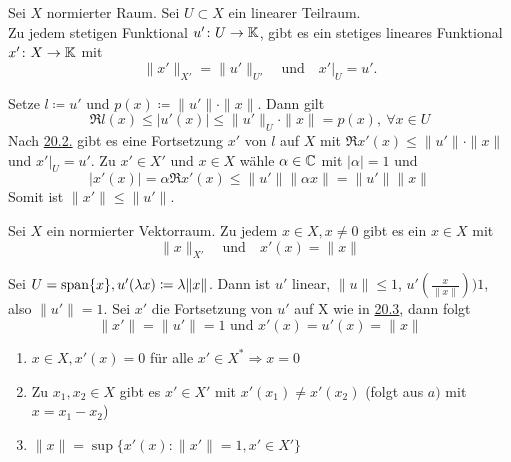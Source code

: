 \begin{satz} \label{satz:20.3-Hahn-Banach} 
	Sei $X$ normierter Raum. Sei $U \subset X$ ein linearer Teilraum. \\
	Zu jedem stetigen Funktional $u' \colon U \rightarrow \mathbb{K}$, gibt es ein stetiges lineares Funktional $x' \colon X \rightarrow \mathbb{K}$ mit 
		\[ \| x' \|_{X'} = \| u' \|_{U'} \quad \text{und} \quad x'|_{U} = u'. \]	
\end{satz}

\begin{beweis}
	Setze $l \coloneqq u'$ und $p(x) \coloneqq \| u'\| \cdot \| x \|$. Dann gilt 
		\[ \Re l(x) \leq | u'(x) | \leq \| u' \|_{U} \cdot \| x \| = p(x), ~ \forall x \in U \]
	Nach \hyperref[satz:20.2-Hahn-Banach]{20.2.} gibt es eine Fortsetzung $x'$ von $l$ auf $X$ mit $\Re x'(x) \leq \| u' \| \cdot \| x \|$ und $x'|_{U} = u'$.	Zu $x' \in X'$ und $x \in X$ wähle $\alpha \in \mathbb{C}$ mit $|\alpha| = 1$ und 
	\[ | x'(x) | = \alpha \Re x'(x) \leq \| u' \| \| \alpha x \| = \| u' \| \| x \|\]
	Somit ist $\| x' \| \leq \| u' \|$.
\end{beweis}


\begin{kor} \label{kor:20.4}
	Sei $X$ ein normierter Vektorraum. Zu jedem $x \in X, x \neq 0$ gibt es ein $x \in X$ mit 
		\[ \| x \|_{X'} \quad \text{und} \quad x'(x) = \| x \| \]
\end{kor}

\begin{beweis}
	Sei $U = \operatorname{span} \{ x \}, u'( \lambda x) \coloneqq \lambda \| x \|$. Dann ist $u'$ linear, $\| u \| \leq 1$, $u'(\frac{x}{\| x \|}) ) 1$, also $\| u' \| = 1$. Sei $x'$ die Fortsetzung von $u'$ auf X wie in \hyperref[satz:20.3-Hahn-Banach]{20.3}, dann folgt
	\[ \| x' \| = \| u' \| = 1 \text{ und } x'(x) = u'(x) = \| x \| \]
\end{beweis}


\begin{folgerung}
	\begin{enumerate}[label=\alph*\upshape)]
		\item $x \in X, x'(x) = 0$ für alle $x' \in X^{*} \Rightarrow x = 0$
		\item Zu $x_{1}, x_{2} \in X$ gibt es $x' \in X'$ mit $x'(x_{1}) \neq x'(x_{2})$ (folgt aus $a)$ mit $x = x_{1} - x_{2}$)
		\item $\| x \| = \sup \{ x'(x) : \| x' \| = 1, x' \in X' \}$
	\end{enumerate}	
\end{folgerung}

